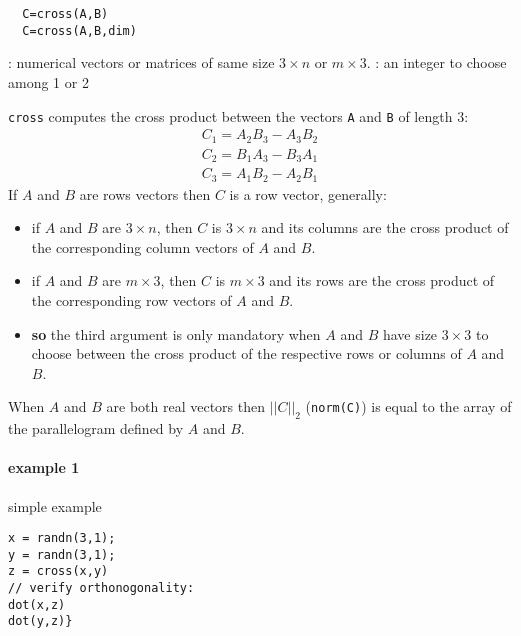 \begin{mandesc}
\end{mandesc}
\begin{calling_sequence}
\begin{verbatim}
  C=cross(A,B)  
  C=cross(A,B,dim)  
\end{verbatim}
\end{calling_sequence}
\begin{parameters}
  \begin{varlist}
    : numerical vectors or matrices of same size $3 \times n$ or $m \times 3$. 
    : an integer to choose among 1 or 2
  \end{varlist}
\end{parameters}
\begin{mandescription}
  \verb+cross+ computes the cross product between the vectors \verb+A+ and \verb+B+ of length 3:
$$
\begin{array}{l}
     C_1 = A_2 B_3 - A_3 B_2 \\
     C_2 = B_1 A_3 - B_3 A_1 \\
     C_3 = A_1 B_2 - A_2 B_1
\end{array}
$$
 If  $A$ and $B$ are rows vectors then $C$ is a row vector, generally:
 \begin{itemize}
 \item if $A$ and $B$ are $3 \times n$, then $C$ is $3 \times n$ and its columns are the 
 cross product  of the corresponding column vectors of  $A$ and $B$.
 \item if $A$ and $B$ are $m \times 3$, then $C$ is $m \times 3$ and its rows are the 
 cross product  of the corresponding row vectors of  $A$ and $B$.
 \item {\bf so} the third argument is only mandatory when  $A$ and $B$ have size $3 \times 3$
 to choose between the cross product of the respective rows or columns of $A$ and $B$.
\end{itemize}
When $A$ and $B$ are both real vectors then $|| C ||_2$ (\verb+norm(C)+) is equal to the 
array of the parallelogram defined by $A$ and $B$.   
\end{mandescription}

\begin{examples}
\paragraph{example 1} simple example
\begin{Verbatim}
x = randn(3,1);
y = randn(3,1);
z = cross(x,y)
// verify orthonogonality:
dot(x,z)
dot(y,z)}
\end{Verbatim}
\end{examples}

\begin{manseealso}
\end{manseealso}

